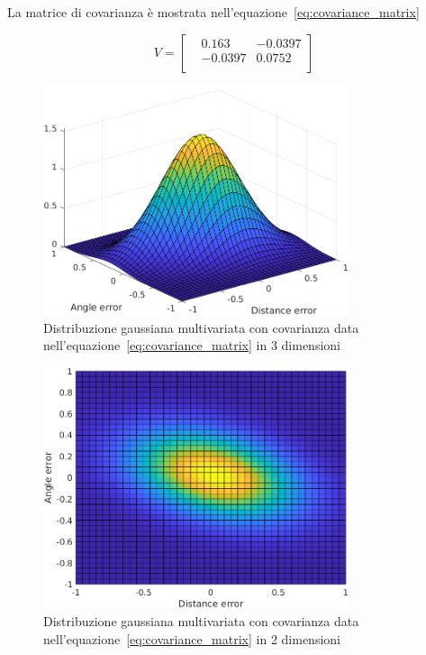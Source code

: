\documentclass[a4paper]{article}
\begin{document}
	La matrice di covarianza è mostrata nell'equazione~\ref{eq:covariance_matrix}  
	
	\begin{equation}\label{eq:covariance_matrix}
		V = \begin{bmatrix}
			& 0.163  &-0.0397 \\
			&-0.0397 & 0.0752 \\
		\end{bmatrix}
	\end{equation}
	
	\begin{figure}[H]
		\centering
		\includegraphics[width=0.8\textwidth]{./img/error_covariance.png}
		\caption{Distribuzione gaussiana multivariata con covarianza data nell'equazione~\ref{eq:covariance_matrix} in 3 dimensioni}
		\label{fig:error_covariance}
	\end{figure}

	\begin{figure}[H]
		\centering
		\includegraphics[width=0.8\textwidth]{./img/error_covariance_flat.png}
		\caption{Distribuzione gaussiana multivariata con covarianza data nell'equazione~\ref{eq:covariance_matrix}  in 2 dimensioni}
		\label{fig:error_covariance_flat}
	\end{figure}
	
\end{document}
